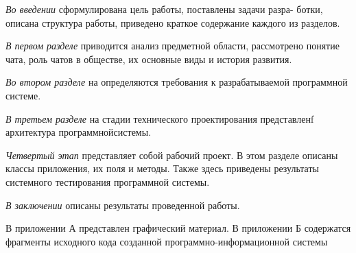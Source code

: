 \emph{Во введении} сформулирована цель работы, поставлены задачи разра-
ботки, описана структура работы, приведено краткое содержание каждого из разделов.

\emph{В первом разделе} приводится анализ предметной области, рассмотрено понятие чата, роль чатов в обществе, их основные виды и история развития. 

\emph{Во втором разделе} на определяются требования к разрабатываемой программной системе.

\emph{В третьем разделе} на стадии технического проектирования представленf архитектура программнойсистемы.

\emph{Четвертый этап} представляет собой рабочий проект. В этом разделе описаны классы приложения, их поля и методы. Также здесь приведены результаты системного тестирования программной системы.

\emph{В заключении} описаны результаты проведенной работы.

В приложении А представлен графический материал.
В приложении Б содержатся фрагменты исходного кода созданной
программно-информационной системы